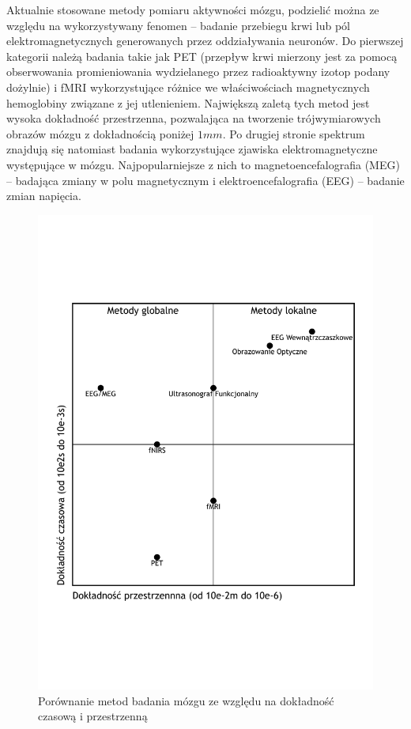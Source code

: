 \documentclass{./assets/wfis}
\begin{document}
Aktualnie stosowane metody pomiaru aktywności mózgu, podzielić można ze względu na wykorzystywany fenomen – badanie przebiegu krwi lub pól elektromagnetycznych generowanych przez oddziaływania neuronów. Do pierwszej kategorii należą badania takie jak PET (przepływ krwi mierzony jest za pomocą obserwowania promieniowania wydzielanego przez radioaktywny izotop podany dożylnie) i fMRI wykorzystujące różnice we właściwościach magnetycznych hemoglobiny związane z jej utlenieniem. Największą zaletą tych metod jest wysoka dokładność przestrzenna, pozwalająca na tworzenie trójwymiarowych obrazów mózgu z dokładnością poniżej $1mm$. Po drugiej stronie  spektrum znajdują się natomiast badania wykorzystujące zjawiska elektromagnetyczne występujące w mózgu. Najpopularniejsze z nich to magnetoencefalografia (MEG) – badająca zmiany w polu magnetycznym i elektroencefalografia (EEG) – badanie zmian napięcia. 

\begin{figure}[h]
    \centering
    \includegraphics[width=0.75\columnwidth, trim={0 6cm 0 6cm}]{diagrams/brain_imaging.pdf}
    \caption{Porównanie metod badania mózgu ze względu na dokładność czasową i przestrzenną}
    \label{fig:brain-imaging-comparasion}
\end{figure}
\end{document}
